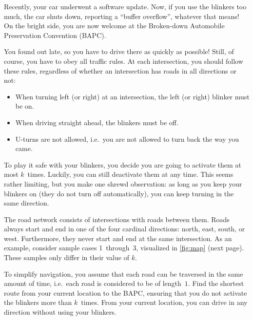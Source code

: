 \problemname{}

\newcommand{\maxn}{5000}
\newcommand{\maxk}{20}


Recently, your car underwent a software update. Now, if you use the blinkers too much, the car shuts down, reporting a ``buffer overflow''\!, whatever that means!
On the bright side, you are now welcome at the Broken-down Automobile Preservation Convention (BAPC).

You found out late, so you have to drive there as quickly as possible!
Still, of course, you have to obey all traffic rules.
At each intersection, you should follow these rules, regardless of whether an intersection has roads in all directions or not: \vspace{-\parskip}
\begin{itemize}
    \itemsep0em
    \item When turning left (or right) at an intersection, the left (or right) blinker must be on.
    \item When driving straight ahead, the blinkers must be off.
    \item U-turns are not allowed, i.e.\ you are not allowed to turn back the way you came.
\end{itemize}

To play it safe with your blinkers, you decide you are going to activate them at most $k$~times. Luckily, you can still deactivate them at any time.
This seems rather limiting, but you make one shrewd observation: as long as you keep your blinkers on (they do not turn off automatically), you can keep turning in the same direction. %

The road network consists of intersections with roads between them.
Roads always start and end in one of the four cardinal directions: north, east, south, or west. Furthermore, they never start and end at the same intersection.
As an example, consider sample cases 1~through~3, visualized in \autoref{fig:map} (next page). These samples only differ in their value of $k$.

To simplify navigation, you assume that each road can be traversed in the same amount of time, i.e.\ each road is considered to be of length~$1$. %
Find the shortest route from your current location to the BAPC, ensuring that you do not activate the blinkers more than $k$~times.
From your current location, you can drive in any direction without using your blinkers.

